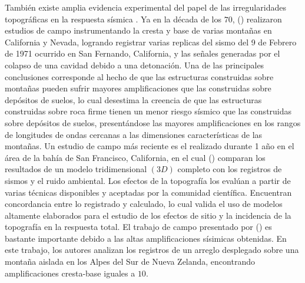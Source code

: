 \documentclass[spanish,letterpaper,12pt,twoside,openany]{article}
\begin{document}
También existe amplia evidencia experimental del papel de las irregularidades topográficas en la respuesta sísmica \citep[por ejemplo,][]{Hartzell2013, Buech2010, Tucker1984, Griffiths1979, Rogers1974, Davis1973}. Ya en la década de los $70$, \citeauthor{Davis1973} (\citeyear{Davis1973}) realizaron estudios de campo instrumentando la cresta y base de varias montañas en California y Nevada, logrando registrar varias replicas del sismo del 9 de Febrero de 1971 ocurrido en San Fernando, California, y las señales generadas por el colapso de una cavidad debido a una detonación. Una de las principales conclusiones corresponde al hecho de que las estructuras construidas sobre montañas pueden sufrir mayores amplificaciones que las construidas sobre depósitos de suelos, lo cual desestima la creencia de que las estructuras construidas sobre roca firme tienen un menor riesgo sísmico que las construidas sobre depósitos de suelos, presentándose las mayores amplificaciones en los rangos de longitudes de ondas cercanas a las dimensiones características de las montañas. Un estudio de campo más reciente es el realizado durante 1 año en el área de la bahía de San Francisco, California, en el cual \citeauthor{Hartzell2013} (\citeyear{Hartzell2013}) comparan los resultados de un modelo tridimensional $\left( 3D \right)$ completo con los registros de sismos y el ruido ambiental. Los efectos de la topografía los evalúan a partir de varias técnicas disponibles y aceptadas por la comunidad científica. Encuentran concordancia entre lo registrado y calculado, lo cual valida el uso de modelos altamente elaborados para el estudio de los efectos de sitio y la incidencia de la topografía en la respuesta total. El trabajo de campo presentado por \citeauthor{Buech2010} (\citeyear{Buech2010}) es bastante importante debido a las altas amplificaciones sísimicas obtenidas. En este trabajo, los autores analizan los registros de un arreglo desplegado sobre una montaña aislada en los Alpes del Sur de Nueva Zelanda, encontrando amplificaciones cresta-base iguales a $10$.
\end{document}
